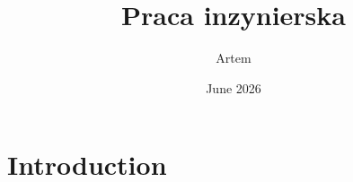 \documentclass{article}
\title{Praca inzynierska}
\author{Artem }
\date{June 2026}
\begin{document}
\maketitle

\section{Introduction}
\end{document}
